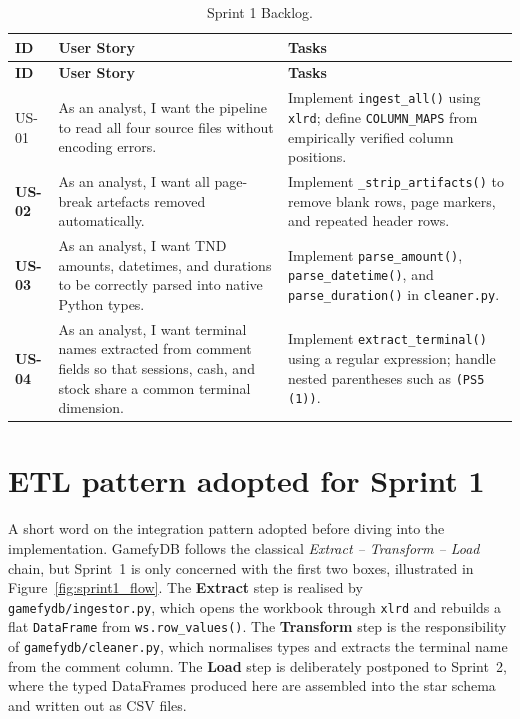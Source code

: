 \begin{longtable}{>{\bfseries}p{1.3cm} p{4.2cm} p{7cm}}
  \caption{Sprint 1 Backlog.\label{tab:sprint1_backlog}} \\
  \toprule
  \textbf{ID} & \textbf{User Story} & \textbf{Tasks} \\
  \midrule
  \endfirsthead
  \toprule
  \textbf{ID} & \textbf{User Story} & \textbf{Tasks} \\
  \midrule
  \endhead
  \bottomrule
  \endfoot

  US-01 & As an analyst, I want the pipeline to read all four source files
          without encoding errors.
        & Implement \texttt{ingest\_all()} using \texttt{xlrd}; define
          \texttt{COLUMN\_MAPS} from empirically verified column positions. \\[4pt]

  US-02 & As an analyst, I want all page-break artefacts removed automatically.
        & Implement \texttt{\_strip\_artifacts()} to remove blank rows, page
          markers, and repeated header rows. \\[4pt]

  US-03 & As an analyst, I want TND amounts, datetimes, and durations to be
          correctly parsed into native Python types.
        & Implement \texttt{parse\_amount()}, \texttt{parse\_datetime()}, and
          \texttt{parse\_duration()} in \texttt{cleaner.py}. \\[4pt]

  US-04 & As an analyst, I want terminal names extracted from comment fields so
          that sessions, cash, and stock share a common terminal dimension.
        & Implement \texttt{extract\_terminal()} using a regular expression;
          handle nested parentheses such as \texttt{(PS5\,(1))}. \\
\end{longtable}

\section{ETL pattern adopted for Sprint 1}

A short word on the integration pattern adopted before diving into the
implementation. GamefyDB follows the classical \textit{Extract –
Transform – Load} chain, but Sprint~1 is only concerned with the first
two boxes, illustrated in Figure~\ref{fig:sprint1_flow}. The
\textbf{Extract} step is realised by \texttt{gamefydb/ingestor.py}, which
opens the workbook through \texttt{xlrd} and rebuilds a flat
\texttt{DataFrame} from \texttt{ws.row\_values()}. The \textbf{Transform}
step is the responsibility of \texttt{gamefydb/cleaner.py}, which
normalises types and extracts the terminal name from the comment column.
The \textbf{Load} step is deliberately postponed to Sprint~2, where the
typed DataFrames produced here are assembled into the star schema and
written out as CSV files.

